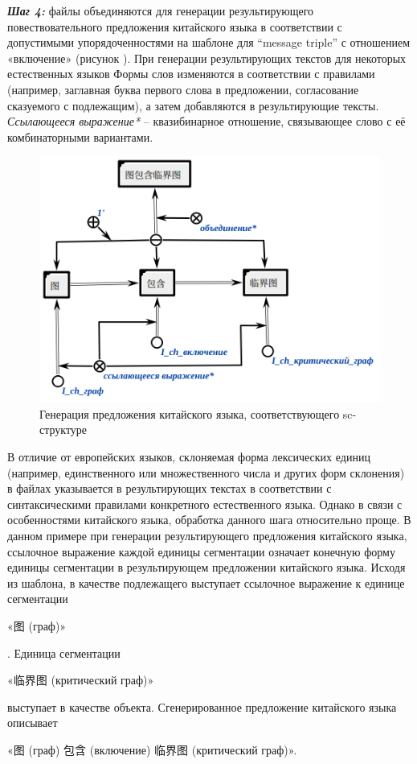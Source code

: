 \textbf{\textit{Шаг 4:}} файлы объединяются для генерации результирующего повествовательного предложения китайского языка в соответствии с допустимыми упорядоченностями на шаблоне для ``message triple'' с отношением «включение» (рисунок \textit{}). При генерации результирующих текстов для некоторых естественных языков Формы слов изменяются в соответствии с правилами (например, заглавная буква первого слова в предложении, согласование сказуемого с подлежащим), а затем добавляются в результирующие тексты. \textit{Ссылающееся выражение*} -- квазибинарное отношение, связывающее слово с её комбинаторными вариантами. 
\begin{figure}[H]
	\centering
	\includegraphics[scale=0.7]{images/part4/chapter_chinese/chinese_sentence_generated.png}
	\caption{Генерация предложения китайского языка, соответствующего sc-структуре}
	\label{fig:sentence-generated}
\end{figure}

В отличие от европейских языков, склоняемая форма лексических единиц (например, единственного или множественного числа и других форм склонения) в файлах указывается в результирующих текстах в соответствии с синтаксическими правилами конкретного естественного языка. Однако в связи с особенностями китайского языка, обработка данного шага относительно проще. В данном примере при генерации результирующего предложения китайского языка, ссылочное выражение каждой единицы сегментации означает конечную форму единицы сегментации в результирующем предложении китайского языка. Исходя из шаблона, в качестве подлежащего выступает ссылочное выражение к единице сегментации \begin{CJK}{UTF8}{gbsn} «图 (граф)» \end{CJK}. Единица сегментации \begin{CJK}{UTF8}{gbsn} «临界图 (критический граф)» \end{CJK} выступает в качестве объекта. Сгенерированное предложение китайского языка описывает \begin{CJK}{UTF8}{gbsn}«图 (граф) 包含 (включение) 临界图 (критический граф)». \end{CJK}

